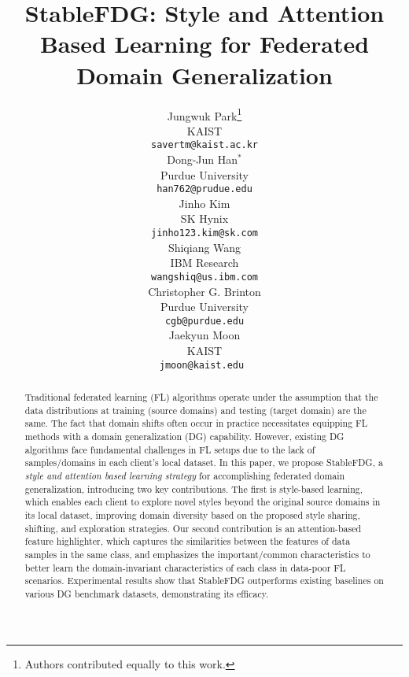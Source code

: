 \documentclass{article}
\title{StableFDG: Style and Attention Based  Learning for Federated Domain Generalization}
\author{%
  Jungwuk Park\thanks{Authors contributed equally to this work.} \\
  KAIST\\
  \texttt{savertm@kaist.ac.kr} \\ 
  \And
  Dong-Jun Han$^{*}$ \\
  Purdue University\\
  \texttt{han762@prudue.edu} \\
  \And
  Jinho Kim \\
  SK Hynix\\
  \texttt{jinho123.kim@sk.com} \\
  \And
Shiqiang Wang \\
  IBM Research\\
  \texttt{wangshiq@us.ibm.com} \\
  \And
  Christopher G. Brinton \\
  Purdue University\\
  \texttt{cgb@purdue.edu} \\
  \And
  Jaekyun Moon \\
  KAIST \\
  \texttt{ jmoon@kaist.edu \ } \\
}
\theoremstyle{plain}
\theoremstyle{definition}
\theoremstyle{remark}
\begin{document}
\maketitle


\begin{abstract}
Traditional federated learning (FL) algorithms operate under the assumption that the data distributions at training (source domains) and testing (target domain) are the same. The fact that domain shifts often occur in practice necessitates equipping FL methods with a domain generalization (DG) capability. However, existing DG algorithms face fundamental challenges in FL setups due to the lack of samples/domains in each client’s  local dataset. In this paper, we propose StableFDG, a \textit{style and attention based learning strategy} for accomplishing federated domain generalization, introducing two key contributions. The first is style-based learning, which enables each client to explore novel styles beyond the original source domains in its local dataset, improving domain diversity based on the proposed style sharing, shifting, and exploration strategies. Our second contribution is an attention-based feature highlighter, which captures the similarities between the features of data samples in the same class, and emphasizes the important/common characteristics to better learn the domain-invariant characteristics of each class in data-poor FL scenarios. Experimental results show that StableFDG outperforms existing baselines on various DG benchmark datasets, demonstrating its efficacy.








\end{abstract}
\end{document}
